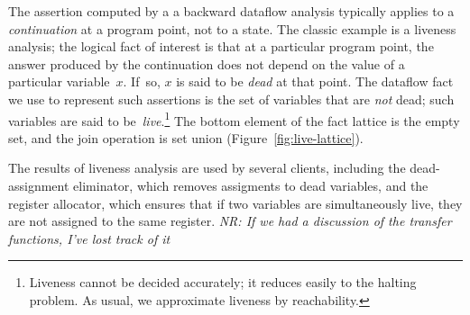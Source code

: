 \documentclass[blockstyle,preprint,nocopyrightspace]{sigplanconf}
\newcommand{\authornote}[1]{{\em #1}}
\newcommand{\norman}[1]{\authornote{NR: #1}}
\let\remark\norman
\newcommand\figref[1]{Figure~\ref{fig:#1}}
\begin{document}
The assertion computed by a 
a backward dataflow analysis typically applies to a
\emph{continuation} at a program point, not to a state.
The classic example is a liveness analysis;
the logical fact of interest is that at a particular program point,
the answer produced by the continuation does not depend on
the value of a particular variable~$x$.
If~so, $x$ is said to be \emph{dead} at that point.
The dataflow fact we use to represent such assertions is the set of
variables that are \emph{not} dead; such variables are said to
be~\emph{live}.\footnote
{Liveness cannot be decided accurately; it reduces easily to the halting problem.
As usual, we approximate liveness by reachability.}
The bottom element of the fact lattice is the empty set, and the join
operation is set union (\figref{live-lattice}).

The results of liveness analysis are used by several clients,
including the dead-assignment eliminator,
which removes assigments to dead variables, 
and the register allocator, which
ensures that if two variables are simultaneously
live, they are not assigned to the same register.
\remark{If we had a discussion of the transfer functions, I've lost
track of it}

\end{document}
